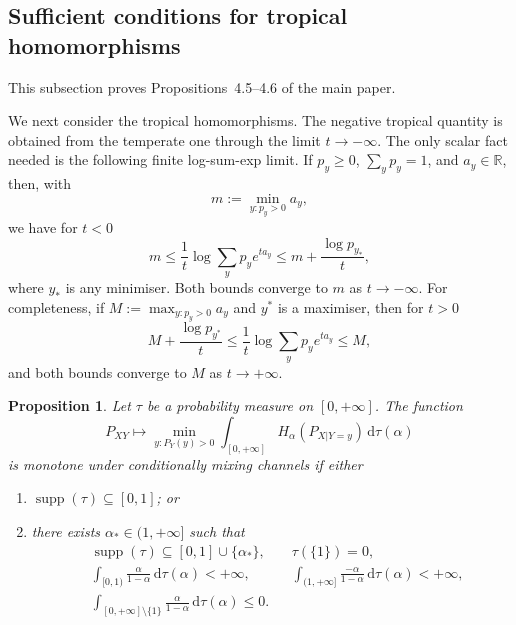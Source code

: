 \documentclass[aps,pra,11pt,onecolumn,nofootinbib,tightenlines]{revtex4-2}
\newtheorem{proposition}[theorem]{Proposition}
\theoremstyle{definition}
\begin{document}
\subsection{Sufficient conditions for tropical homomorphisms}

This subsection proves Propositions~4.5--4.6 of the main paper.

We next consider the tropical homomorphisms. The negative tropical quantity is obtained from the temperate one through the limit $t\to-\infty$. The only scalar fact needed is the following finite log-sum-exp limit. If $p_y\geq0$, $\sum_yp_y=1$, and $a_y\in\mathbb R$, then, with
\begin{equation}
 m:=\min_{y:p_y>0}a_y,
 \label{eq:min-a-y}
\end{equation}
we have for $t<0$
\begin{equation}
 m\leq
 \frac1t\log\sum_yp_ye^{ta_y}
 \leq m+\frac{\log p_{y_*}}t,
 \label{eq:negative-log-sum-exp-bound}
\end{equation}
where $y_*$ is any minimiser. Both bounds converge to $m$ as $t\to-\infty$.
For completeness, if
$M:=\max_{y:p_y>0}a_y$ and $y^*$ is a maximiser, then for $t>0$
\begin{equation}
 M+\frac{\log p_{y^*}}t
 \leq\frac1t\log\sum_yp_ye^{ta_y}\leq M,
 \label{eq:positive-log-sum-exp-bound}
\end{equation}
and both bounds converge to $M$ as $t\to+\infty$.

\begin{proposition}
\label{prop:negative-tropical-sufficient}
Let $\tau$ be a probability measure on $[0,+\infty]$. The function
\begin{equation}
 P_{XY}\longmapsto
 \min_{y:P_Y(y)>0}
 \int_{[0,+\infty]}
 H_\alpha(P_{X|Y=y})\,\mathrm d\tau(\alpha)
 \label{eq:negative-tropical-quantity}
\end{equation}
 is monotone under conditionally mixing channels if either
\begin{enumerate}
 \item $\operatorname{supp}(\tau)\subseteq[0,1]$; or
 \item there exists $\alpha_*\in(1,+\infty]$ such that
 \begin{equation}
  \begin{aligned}
  &\operatorname{supp}(\tau)\subseteq[0,1]\cup\{\alpha_*\},
  &&\tau(\{1\})=0,\\
  &\int_{[0,1)}\frac{\alpha}{1-\alpha}\,\mathrm d\tau(\alpha)<+\infty,
  &&\int_{(1,+\infty]}\frac{-\alpha}{1-\alpha}\,\mathrm d\tau(\alpha)<+\infty,\\
  &\int_{[0,+\infty]\setminus\{1\}}
  \frac{\alpha}{1-\alpha}\,\mathrm d\tau(\alpha)
  \leq0.
  \end{aligned}
  \label{eq:negative-tropical-sufficient-condition}
 \end{equation}
\end{enumerate}
\end{proposition}
\end{document}
